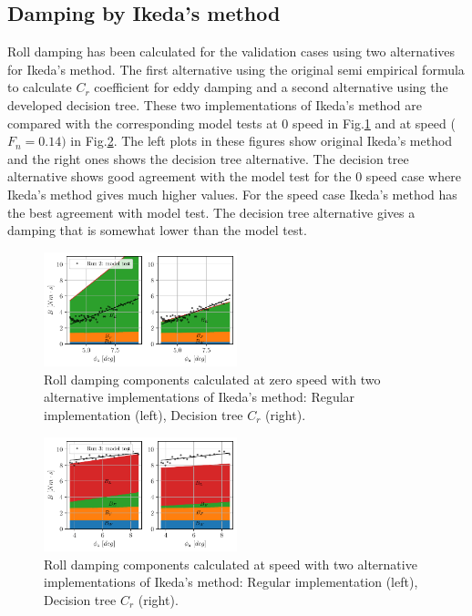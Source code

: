 \subsection*{Damping by Ikeda's method}\label{damping-by-ikedas-method}
Roll damping has been calculated for the validation cases using two
alternatives for Ikeda's method. The first alternative using the
original semi empirical formula to calculate $C_r$ coefficient for
eddy damping and a second alternative using the developed decision tree.
These two implementations of Ikeda's method are compared with the
corresponding model tests at 0 speed in Fig.\ref{fig:ikeda} and
at speed ($F_n=0.14)$ in Fig.\ref{fig:ikeda_speed}. The left
plots in these figures show original Ikeda's method and the right ones
shows the decision tree alternative. The decision tree alternative shows
good agreement with the model test for the 0 speed case where Ikeda's
method gives much higher values. For the speed case Ikeda's method has
the best agreement with model test. The decision tree alternative gives
a damping that is somewhat lower than the model test.
\begin{figure}[H]
\begin{center}\includegraphics[width = 0.5\textwidth]{figures/ikeda.pdf}\end{center}
\vspace{-1cm}
\caption{Roll damping components calculated at zero speed with two alternative implementations of Ikeda's method: Regular implementation (left), Decision tree $C_r$ (right).}
\label{fig:ikeda}
\end{figure}
\begin{figure}[H]
\begin{center}\includegraphics[width = 0.5\textwidth]{figures/ikeda_speed.pdf}\end{center}
\vspace{-1cm}
\caption{Roll damping components calculated at speed with two alternative implementations of Ikeda's method: Regular implementation (left), Decision tree $C_r$ (right).}
\label{fig:ikeda_speed}
\end{figure}
